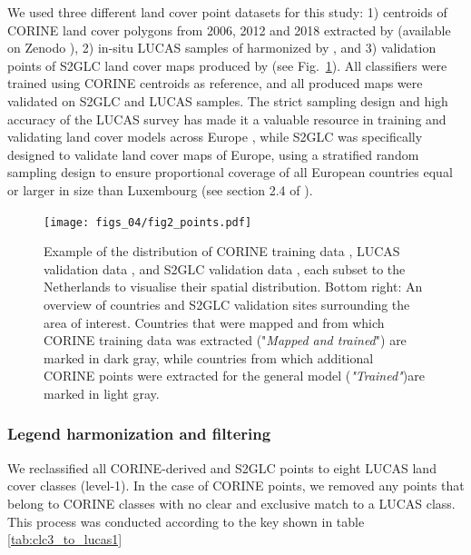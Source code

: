         We used three different land cover point datasets for this study: 1) centroids of CORINE land cover polygons from 2006, 2012 and 2018 extracted by \citet{witjes2022spatiotemporal} (available on Zenodo \citep{landa2021multi}), 2) in-situ LUCAS samples of harmonized by \citet{dandrimont2020harmonised}, and 3) validation points of S2GLC land cover maps \citep{malinowski2020automated} produced by \citet{jenerowicz2021validation} (see Fig.~\ref{fig:points}). All classifiers were trained using CORINE centroids as reference, and all produced maps were validated on S2GLC and LUCAS samples. The strict sampling design and high accuracy of the LUCAS survey has made it a valuable resource in training and validating land cover models across Europe \citep{benevides2021land,pflugmacher2019mapping,sparks2022mapping,verhegghen2021accuracy,witjes2022spatiotemporal}, while S2GLC was specifically designed to validate land cover maps of Europe, using a stratified random sampling design to ensure proportional coverage of all European countries equal or larger in size than Luxembourg (see section 2.4 of \citet{malinowski2020automated}).

        \begin{figure}
        \centering
        \texttt{[image: figs\_04/fig2\_points.pdf]}
        
        \caption{Example of the distribution of CORINE training data \citep{witjes2022spatiotemporal}, LUCAS validation data \citep{dandrimont2020harmonised}, and S2GLC validation data \citep{jenerowicz2021validation}, each subset to the Netherlands to visualise their spatial distribution. Bottom right: An overview of countries and S2GLC validation sites surrounding the area of interest. Countries that were mapped and from which CORINE training data was extracted ("\textit{Mapped and trained}") are marked in dark gray, while countries from which additional CORINE points were extracted for the general model (\textit{"Trained"})are marked in light gray.}
        \label{fig:points}
        \end{figure}

    \subsubsection{Legend harmonization and filtering}
    
        We reclassified all CORINE-derived and S2GLC points to eight LUCAS land cover classes (level-1). In the case of CORINE points, we removed any points that belong to CORINE classes with no clear and exclusive match to a LUCAS class. This process was conducted according to the key shown in table \ref{tab:clc3_to_lucas1}

